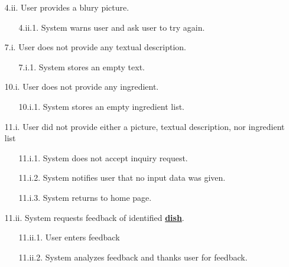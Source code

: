 \documentclass[]{article}
\begin{document}
\begin{enumerate}[{\bf BE1.}]
\begin{enumerate}[{\bf VP1.}]
\begin{enumerate}
					\item[4.ii.] User provides a blury picture.
					\begin{enumerate}
						\item[4.ii.1.] System warns user and ask user to try again.
					\end{enumerate}
				\end{enumerate}
				\begin{enumerate}
					\item[7.i.] User does not provide any textual description.
					\begin{enumerate}
						\item[7.i.1.] System stores an empty text.
					\end{enumerate}
				\end{enumerate}
				\begin{enumerate}
					\item[10.i.] User does not provide any ingredient.
					\begin{enumerate}
						\item[10.i.1.] System stores an empty ingredient list.
					\end{enumerate}
				\end{enumerate}
				\begin{enumerate}
					\item[11.i.] User did not provide either a picture, textual description, nor ingredient list
					\begin{enumerate}
						\item[11.i.1.] System does not accept inquiry request.
						\item[11.i.2.] System notifies user that no input data was given.
						\item[11.i.3.] System returns to home page.
					\end{enumerate}
					\item[11.ii.] System requests feedback of identified \hyperref[Dish]{\textbf{dish}}.
					\begin{enumerate}
						\item[11.ii.1.] User enters feedback
						\item[11.ii.2.] System analyzes feedback and thanks user for feedback.
					\end{enumerate}
				\end{enumerate}


\end{enumerate}
\end{enumerate}
\end{document}

